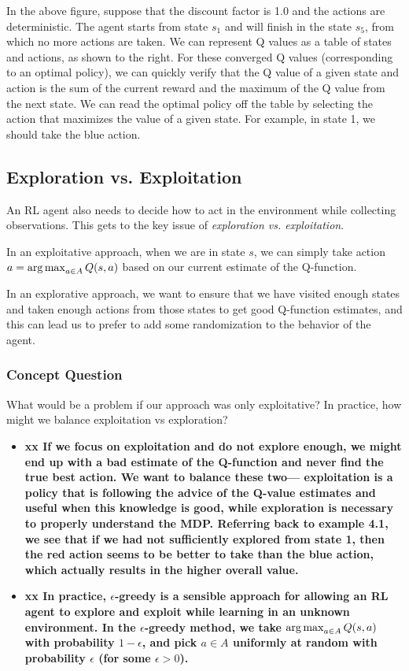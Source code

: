 \documentclass[12pt]{article}
\begin{document}
In the above figure, suppose that the discount factor is 1.0 and the actions are deterministic. The agent starts from state $s_1$ and will finish in the state $s_5$, from which no more actions are taken. We can represent Q values as a table of states and actions, as shown to the right. For these converged Q values (corresponding to an optimal policy), we can quickly verify that the Q value of a given state and action is the sum of the current reward and the maximum of the Q value from the next state. We can read the optimal policy off the table by selecting the action that maximizes the value of a given state. For example, in state 1, we should take the blue action.  

\subsection{Exploration vs. Exploitation}

An RL agent also needs to decide how to act in the environment while
collecting observations. This gets to the
key issue of \emph{exploration vs. exploitation}.

In an exploitative approach, when we are in state $s$, we can simply
take action $a = \argmax_{a \in A} Q(s,a)$ based on our current
estimate of the Q-function.

In an explorative approach, we want to ensure that we have visited
enough states and taken enough actions from those states to get good
Q-function estimates, and this can lead us to prefer to add some
randomization to the behavior of the agent.

\subsubsection{Concept Question}

What would be a problem if our approach was only exploitative? In
practice, how might we balance exploitation vs exploration?
%
\begin{itemize}
\item {\bf xx If we focus on exploitation and do not explore enough,
    we might end up with a bad estimate of the Q-function and never
    find the true best action. We want to balance these two---
    exploitation  is a policy that is following the advice of the
    Q-value estimates and useful when this knowledge is good,
    while exploration is necessary to properly understand the MDP. Referring back to example 4.1, we see that if we had not sufficiently explored from state 1, then the red action seems to be better to take than the blue action, which actually results in the higher overall value. }
%
\item {\bf xx  In practice, $\epsilon$-greedy is a sensible approach
    for allowing an RL agent to explore and exploit while learning in an
    unknown environment.
    In the $\epsilon$-greedy method, we take $\argmax_{a \in A} Q(s,a)$ with probability $1-\epsilon$, and pick $a \in A$ uniformly at random with probability $\epsilon$ (for some $\epsilon>0$).}
%
\end{itemize}
\end{document}
